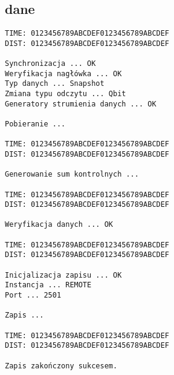 \chapter{}
\label{chap:intro}
\pagebreak

\section{dane}
\label{sec:intro-data}

\begin{verbatim}
TIME: 0123456789ABCDEF0123456789ABCDEF
DIST: 0123456789ABCDEF0123456789ABCDEF

Synchronizacja ... OK
Weryfikacja nagłówka ... OK
Typ danych ... Snapshot
Zmiana typu odczytu ... Qbit
Generatory strumienia danych ... OK

Pobieranie ... 

TIME: 0123456789ABCDEF0123456789ABCDEF
DIST: 0123456789ABCDEF0123456789ABCDEF

Generowanie sum kontrolnych ... 

TIME: 0123456789ABCDEF0123456789ABCDEF
DIST: 0123456789ABCDEF0123456789ABCDEF

Weryfikacja danych ... OK

TIME: 0123456789ABCDEF0123456789ABCDEF
DIST: 0123456789ABCDEF0123456789ABCDEF

Inicjalizacja zapisu ... OK
Instancja ... REMOTE
Port ... 2501

Zapis ...

TIME: 0123456789ABCDEF0123456789ABCDEF
DIST: 0123456789ABCDEF0123456789ABCDEF

Zapis zakończony sukcesem.
\end{verbatim}
\pagebreak

